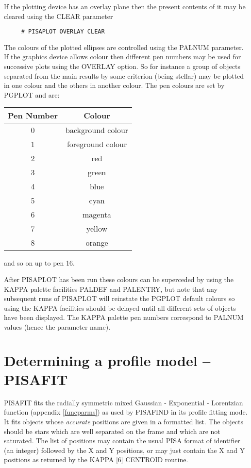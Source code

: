 If the plotting device has an overlay plane then the present contents of
it may be cleared using the CLEAR parameter
\begin{verbatim}
     # PISAPLOT OVERLAY CLEAR
\end{verbatim}

The colours of the plotted ellipses are controlled using the PALNUM
parameter. If the graphics device allows colour then different pen
numbers may be used for successive plots using the OVERLAY option. So for
instance a group of objects separated from the main results by some
criterion (being stellar) may be plotted in one colour and the others in
another colour. The pen colours are set by PGPLOT and are:
\begin{center}
\begin{tabular}{|c|c|}
\hline
Pen Number & Colour \\
\hline
\hline
0 & background colour \\
1 & foreground colour \\
2 & red \\
3 & green \\
4 & blue \\
5 & cyan \\
6 & magenta \\
7 & yellow \\
8 & orange \\
\hline
\end{tabular}
\end{center}
and so on up to pen 16.

After PISAPLOT has been run these colours can be superceded by using the
KAPPA palette facilities PALDEF and PALENTRY, but note that any
subsequent runs of PISAPLOT will reinstate the PGPLOT default colours so
using the KAPPA facilities should be delayed until all different sets of
objects have been displayed. The KAPPA palette pen numbers correspond to
PALNUM values (hence the parameter name).


\section{Determining a profile model -- PISAFIT}
PISAFIT fits the radially symmetric mixed Gaussian - Exponential - 
Lorentzian function (appendix \ref{funcparms}) as used by PISAFIND in
its profile fitting mode. It fits objects whose {\em accurate} positions
are given in a formatted list. The objects should be stars which are
well separated on the frame and which are not saturated. The list of
positions may contain the usual PISA format of identifier (an integer)
followed by the X and Y positions, or may just contain the X and Y
positions as returned by the KAPPA [6] CENTROID routine.

